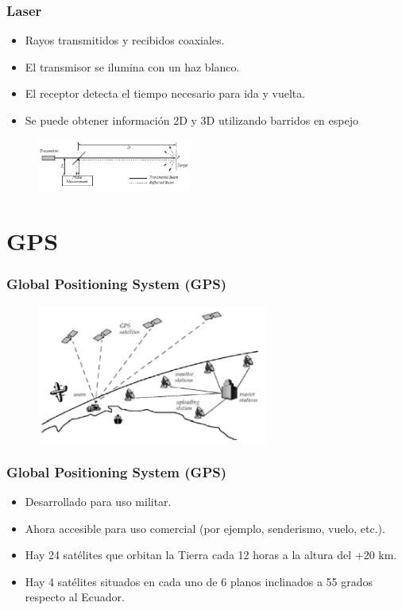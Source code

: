 \documentclass{beamer}
\begin{document}
\begin{frame}
\frametitle{Laser}
\begin{itemize}
\item Rayos transmitidos y recibidos coaxiales.
\item El transmisor se ilumina con un haz blanco.
\item El receptor detecta el tiempo necesario para ida y vuelta.
\item Se puede obtener información 2D y 3D utilizando barridos en espejo
\end{itemize}
\begin{figure}[!h]
\centering
\includegraphics[width=2in]{laser1}
\end{figure}
\end{frame}

\section{GPS}

\begin{frame}
\frametitle{Global Positioning System (GPS)}
\begin{figure}[!h]
\centering
\includegraphics[width=3in]{GPS}
\end{figure}
\end{frame}

\begin{frame}
\frametitle{Global Positioning System (GPS)}
\begin{itemize}
\item Desarrollado para uso militar.
\item Ahora accesible para uso comercial (por ejemplo, senderismo, vuelo, etc.).
\item Hay 24 satélites que orbitan la Tierra cada 12 horas a la altura del +20 km.
\item Hay 4 satélites situados en cada uno de 6 planos inclinados a 55 grados respecto al Ecuador.
\end{itemize}
\end{frame}
\end{document}
